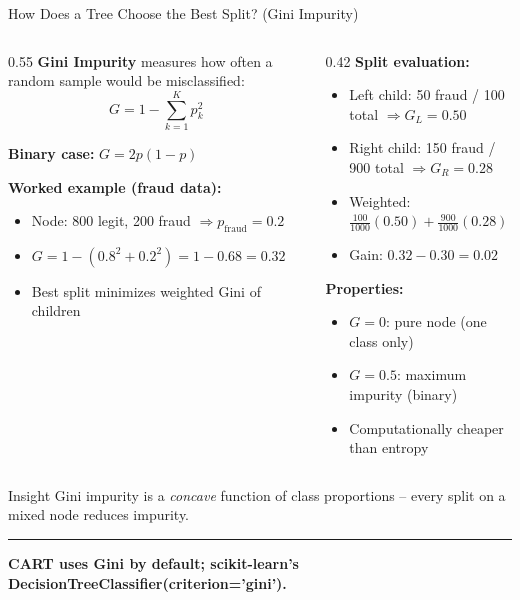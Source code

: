 \documentclass[8pt,aspectratio=169]{beamer}
\newcommand{\bottomnote}[1]{%
\vfill
\vspace{-2mm}
\textcolor{mllavender2}{\rule{\textwidth}{0.4pt}}
\vspace{1mm}
\footnotesize
\textbf{#1}
}
\newenvironment{compactlist}{%
  \begin{itemize}%
    \setlength{\itemsep}{2pt}%
    \setlength{\parskip}{0pt}%
    \setlength{\parsep}{0pt}%
}{%
  \end{itemize}%
}
\begin{document}
\begin{frame}{How Does a Tree Choose the Best Split? (Gini Impurity)}
\begin{columns}[T]
\begin{column}{0.55\textwidth}
\small
\textbf{Gini Impurity} measures how often a random sample would be misclassified:
\[
G = 1 - \sum_{k=1}^{K} p_k^2
\]

\vspace{0.3em}
\footnotesize
\textbf{Binary case:} $G = 2p(1-p)$

\vspace{0.3em}
\textbf{Worked example (fraud data):}
\begin{compactlist}
\item Node: 800 legit, 200 fraud $\Rightarrow p_{\text{fraud}}=0.2$
\item $G = 1 - (0.8^2 + 0.2^2) = 1 - 0.68 = 0.32$
\item Best split minimizes weighted Gini of children
\end{compactlist}
\end{column}
\begin{column}{0.42\textwidth}
\footnotesize
\textbf{Split evaluation:}
\begin{compactlist}
\item Left child: 50 fraud / 100 total $\Rightarrow G_L = 0.50$
\item Right child: 150 fraud / 900 total $\Rightarrow G_R = 0.28$
\item Weighted: $\frac{100}{1000}(0.50) + \frac{900}{1000}(0.28) = 0.30$
\item Gain: $0.32 - 0.30 = 0.02$
\end{compactlist}

\vspace{0.3em}
\textbf{Properties:}
\begin{compactlist}
\item $G = 0$: pure node (one class only)
\item $G = 0.5$: maximum impurity (binary)
\item Computationally cheaper than entropy
\end{compactlist}
\end{column}
\end{columns}

\begin{block}{Insight}
\scriptsize Gini impurity is a \emph{concave} function of class proportions -- every split on a mixed node reduces impurity.
\end{block}
\bottomnote{CART uses Gini by default; scikit-learn's DecisionTreeClassifier(criterion='gini').}
\end{frame}
\end{document}
